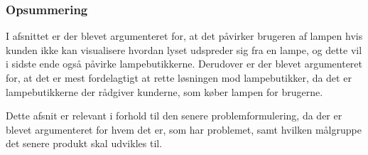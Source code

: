 





\subsubsection*{Opsummering}
I afsnittet er der blevet argumenteret for, at det påvirker brugeren af lampen hvis kunden ikke kan visualisere hvordan lyset udspreder sig fra en lampe, og dette vil i sidste ende også påvirke lampebutikkerne. Derudover er der blevet argumenteret for, at det er mest fordelagtigt at rette løsningen mod lampebutikker, da det er lampebutikkerne der rådgiver kunderne, som køber lampen for brugerne.

Dette afsnit er relevant i forhold til den senere problemformulering, da der er blevet argumenteret for hvem det er, som har problemet, samt hvilken målgruppe det senere produkt skal udvikles til.
